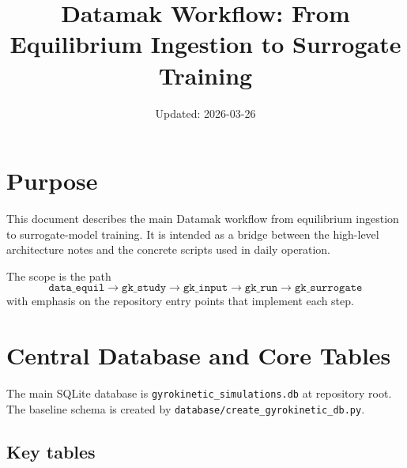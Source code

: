 \documentclass[11pt]{article}
\title{Datamak Workflow: From Equilibrium Ingestion to Surrogate Training}
\author{}
\date{Updated: 2026-03-26}
\newcommand{\code}[1]{\texttt{#1}}
\begin{document}
\sloppy
\maketitle
\tableofcontents

\section{Purpose}

This document describes the main Datamak workflow from equilibrium ingestion to
surrogate-model training. It is intended as a bridge between the high-level
architecture notes and the concrete scripts used in daily operation.

The scope is the path
\[
\code{data\_equil} \rightarrow \code{gk\_study} \rightarrow \code{gk\_input}
\rightarrow \code{gk\_run} \rightarrow \code{gk\_surrogate}
\]
with emphasis on the repository entry points that implement each step.

\section{Central Database and Core Tables}

The main SQLite database is \code{gyrokinetic\_simulations.db} at repository
root. The baseline schema is created by
\code{database/create\_gyrokinetic\_db.py}.

\subsection{Key tables}
\end{document}
